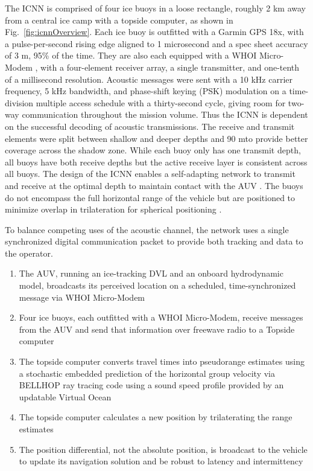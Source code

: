 The ICNN is comprised of four ice buoys in a loose rectangle, roughly 2 km away from a central ice camp with a topside computer, as shown in Fig.~\ref{fig:icnnOverview}.
Each ice buoy is outfitted with a Garmin GPS 18x, with a pulse-per-second rising edge aligned to 1 microsecond and a spec sheet accuracy of 3 m, 95\% of the time.
They are also each equipped with a WHOI Micro-Modem \citep{Singh2006}, with a four-element receiver array, a single transmitter, and one-tenth of a millisecond resolution.
 Acoustic messages were sent with a 10 kHz carrier frequency, 5 kHz bandwidth, and phase-shift keying (PSK) modulation on a time-division multiple access schedule with a thirty-second cycle, giving room for two-way communication throughout the mission volume.
Thus the ICNN is dependent on the successful decoding of acoustic transmissions.
The receive and transmit elements were split between shallow and deeper depths and 90 m\textemdash to provide better coverage across the shadow zone.
While each buoy only has one transmit depth, all buoys have both receive depths but the active receive layer is consistent across all buoys. 
The design of the ICNN enables a self-adapting network to transmit and receive at the optimal depth to maintain contact with the AUV \citep{schneider_self-adapting_2020}.
The buoys do not encompass the full horizontal range of the vehicle but are positioned to minimize overlap in trilateration for spherical positioning \citep{deffenbaugh1996posit}.

To balance competing uses of the acoustic channel, the network uses a single synchronized digital communication packet to provide both tracking and data to the operator.
\begin{enumerate}
\item The AUV, running an ice-tracking DVL and an onboard hydrodynamic model, broadcasts its perceived location on a scheduled, time-synchronized message via WHOI Micro-Modem
\item Four ice buoys, each outfitted with a WHOI Micro-Modem, receive messages from the AUV and send that information over freewave radio to a Topside computer
\item The topside computer converts travel times into pseudorange estimates using a stochastic embedded prediction of the horizontal group velocity via BELLHOP ray tracing code \citep{Porter2011} using a sound speed profile provided by an updatable Virtual Ocean \citep{schneider_netsim_2018,bhatt_embedded_2022}
\item The topside computer calculates a new position by trilaterating the range estimates
\item The position differential, not the absolute position, is broadcast to the vehicle to update its navigation solution and be robust to latency and intermittency
\end{enumerate}

